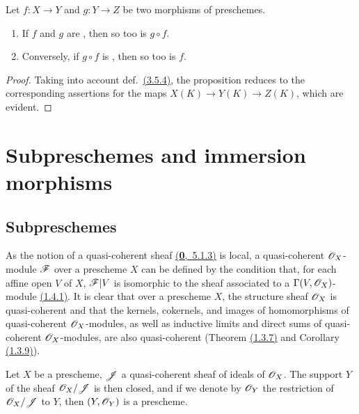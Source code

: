 \begin{prop}[3.5.6]
\label{prop-1.3.5.6}
Let $f\colon X\to Y$ and $g\colon Y\to Z$ be two morphisms of preschemes.
\begin{enumerate}
    \item If $f$ and $g$ are , then so too is $g\circ f$.
    \item Conversely, if $g\circ f$ is , then so too is $f$.
\end{enumerate}
\end{prop}

\begin{proof}
\label{proof-prop-1.3.5.6}
Taking into account def.~\hyperref[defn-1.3.5.4]{(3.5.4)}, the proposition reduces to the corresponding assertions for the maps $X(K)\to Y(K)\to Z(K)$, which are evident.
\end{proof}

\begin{prop}[3.5.7]
\label{prop-3.5.7}
\end{prop}

\section{Subpreschemes and immersion morphisms}
\label{section-subpreschemes-and-immersion-morphisms}

\subsection{Subpreschemes}
\label{subsection-subpreschemes}

\begin{env}[4.1.1]
\label{env-1.4.1.1}
As the notion of a quasi-coherent sheaf \hyperref[env-0.5.1.3]{(\textbf{0},~5.1.3)} is local,
a quasi-coherent $\mathscr{O}_X$-module $\mathscr{F}$ over a prescheme $X$ can be defined by the condition
that, for each affine open $V$ of $X$, $\mathscr{F}|V$ is isomorphic to the sheaf associated to a
$\Gamma(V,\mathscr{O}_X)$-module \hyperref[thm-1.1.4.1]{(1.4.1)}. It is clear that over a prescheme
$X$, the structure sheaf $\mathscr{O}_X$ is quasi-coherent and that the kernels, cokernels, and
images of homomorphisms of quasi-coherent $\mathscr{O}_X$-modules, as well as inductive limits and
direct sums of quasi-coherent $\mathscr{O}_X$-modules, are also quasi-coherent
(Theorem \hyperref[thm-1.1.3.7]{(1.3.7)} and Corollary \hyperref[cor-1.1.3.9]{(1.3.9)}).
\end{env}

\begin{prop}[4.1.2]
\label{prop-1.4.1.2}
Let $X$ be a prescheme, $\mathscr{J}$ a quasi-coherent sheaf of ideals of $\mathscr{O}_X$. The support
$Y$ of the sheaf $\mathscr{O}_X/\mathscr{J}$ is then closed, and if we denote by $\mathscr{O}_Y$ the restriction
of $\mathscr{O}_X/\mathscr{J}$ to $Y$, then $(Y,\mathscr{O}_Y)$ is a prescheme.
\end{prop}

